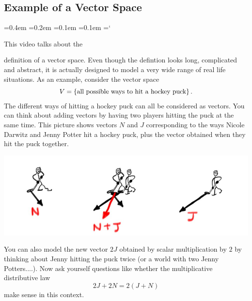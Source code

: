 
\subsection*{Example of a Vector Space}

{\ttfamily
{}\font=0.4em
\font=0.2em
\font=0.1em
\font=0.1em
\hyphenchar\font=`\-


\hypertarget{scripts_vector_spaces_example}{This video talks about the} definition  of
a vector space. Even though the defintion looks long, complicated and abstract, it is actually
designed to model a very wide range of real life situations. As an example, consider the vector space
$$
V=\{\mbox{\rm all possible ways to hit a hockey puck}\}\, .
$$
The different ways of hitting a hockey puck can all be considered as vectors. You can think about adding vectors
by having two players hitting the puck at the same time. This picture shows vectors $N$ and $J$ corresponding to the 
ways Nicole Darwitz and Jenny Potter hit a hockey puck, plus the vector obtained when they hit the puck together.
\begin{center}
\includegraphics[scale=.35]{hockey.jpg}
\end{center}
You can also model the new  vector $2J$ obtained by scalar multiplication by $2$ by thinking about Jenny hitting the puck twice
(or a world with two Jenny Potters....). Now ask yourself questions like whether the multiplicative distributive law
$$2J + 2N = 2(J+N)$$
make sense in this context.





}

